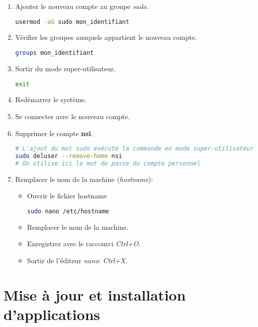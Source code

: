 \documentclass[a4paper,11pt]{article}
\begin{document}
\begin{activite}
\begin{enumerate}
        \item Ajouter le nouveau compte au groupe \emph{sudo}.
        \begin{lstlisting}[language=bash]
usermod -aG sudo mon_identifiant
\end{lstlisting}
        \item Vérifier les groupes auxquels appartient le nouveau compte.
        \begin{lstlisting}[language=bash]
groups mon_identifiant
\end{lstlisting}
        \item Sortir du mode super-utilisateur.
        \begin{lstlisting}[language=bash]
exit
\end{lstlisting}
        \item Redémarrer le système.
        \item Se connecter avec le nouveau compte.
        \item Supprimer le compte \textbf{nsi}.
        \begin{lstlisting}[language=bash]
# L'ajout du mot sudo exécute la commande en mode super-utilisateur.
sudo deluser --remove-home nsi
# On utilise ici le mot de passe du compte personnel
\end{lstlisting}
        \item Remplacer le nom de la machine (\emph{hostname}):
        \begin{itemize}
            \item Ouvrir le fichier hostname
            \begin{lstlisting}[language=bash]
sudo nano /etc/hostname
\end{lstlisting}
            \item Remplacer le nom de la machine.
            \item Enregistrer avec le raccourci \emph{Ctrl+O}.
            \item Sortir de l'éditeur \emph{nano}: \emph{Ctrl+X}.
        \end{itemize}
        
    \end{enumerate}
\end{activite}
\section{Mise à jour et installation d'applications}
\end{document}
